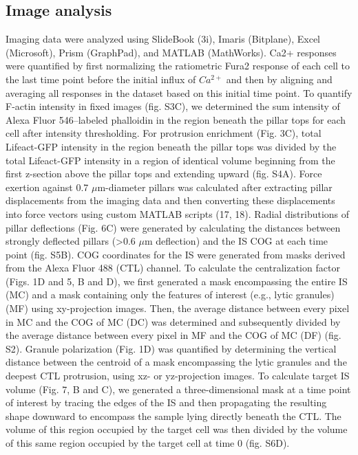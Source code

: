 \subsection{Image analysis}
Imaging data were analyzed using SlideBook (3i), Imaris (Bitplane), Excel (Microsoft), Prism (GraphPad), and MATLAB (MathWorks). Ca2+ responses were quantified by first normalizing the ratiometric Fura2 response of each cell to the last time point before the initial influx of $Ca^{2+}$ and then by aligning and averaging all responses in the dataset based on this initial time point. To quantify F-actin intensity in fixed images (fig. S3C), we determined the sum intensity of Alexa Fluor 546–labeled phalloidin in the region beneath the pillar tops for each cell after intensity thresholding. For protrusion enrichment (Fig. 3C), total Lifeact-GFP intensity in the region beneath the pillar tops was divided by the total Lifeact-GFP intensity in a region of identical volume beginning from the first z-section above the pillar tops and extending upward (fig. S4A). Force exertion against 0.7 $\mu$m-diameter pillars was calculated after extracting pillar displacements from the imaging data and then converting these displacements into force vectors using custom MATLAB scripts (17, 18). Radial distributions of pillar deflections (Fig. 6C) were generated by calculating the distances between strongly deflected pillars (>0.6 $\mu$m deflection) and the IS COG at each time point (fig. S5B). COG coordinates for the IS were generated from masks derived from the Alexa Fluor 488 (CTL) channel. To calculate the centralization factor (Figs. 1D and 5, B and D), we first generated a mask encompassing the entire IS (MC) and a mask containing only the features of interest (e.g., lytic granules) (MF) using xy-projection images. Then, the average distance between every pixel in MC and the COG of MC (DC) was determined and subsequently divided by the average distance between every pixel in MF and the COG of MC (DF) (fig. S2). Granule polarization (Fig. 1D) was quantified by determining the vertical distance between the centroid of a mask encompassing the lytic granules and the deepest CTL protrusion, using xz- or yz-projection images. To calculate target IS volume (Fig. 7, B and C), we generated a three-dimensional mask at a time point of interest by tracing the edges of the IS and then propagating the resulting shape downward to encompass the sample lying directly beneath the CTL. The volume of this region occupied by the target cell was then divided by the volume of this same region occupied by the target cell at time 0 (fig. S6D).


